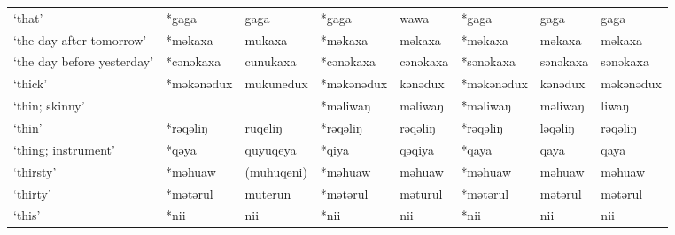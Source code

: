 \begin{landscape}
\begin{longtable}[c]{@{}p{3cm}<{\raggedright}p{2.75cm}<{\raggedright}p{2.75cm}<{\raggedright}p{2.75cm}<{\raggedright}p{2.75cm}<{\raggedright}p{2.75cm}<{\raggedright}p{2.75cm}<{\raggedright}p{2.75cm}<{\raggedright}@{}}
`that'                                               & *gaga        & gaga                          & *gaga          & wawa                       & *gaga            & gaga                     & gaga                              \\
`the day after tomorrow'                             & *məkaxa      & mukaxa                        & *məkaxa        & məkaxa                     & *məkaxa          & məkaxa                   & məkaxa                            \\
`the day before yesterday'                           & *cənəkaxa    & cunukaxa                      & *cənəkaxa      & cənəkaxa                   & *sənəkaxa        & sənəkaxa                 & sənəkaxa                          \\
`thick'                                              & *məkənədux   & mukunedux                     & *məkənədux     & kənədux                    & *məkənədux       & kənədux                  & məkənədux                         \\
`thin; skinny'                                       &              &                               & *məliwaŋ       & məliwaŋ                    & *məliwaŋ         & məliwaŋ                  & liwaŋ                             \\
`thin'                                               & *rəqəliŋ     & ruqeliŋ                       & *rəqəliŋ       & rəqəliŋ                    & *rəqəliŋ         & ləqəliŋ                  & rəqəliŋ                           \\
`thing; instrument'                                  & *qəya        & quyuqeya                      & *qiya          & qəqiya                     & *qaya            & qaya                     & qaya                              \\
`thirsty'                                            & *məhuaw      & (muhuqeni)                    & *məhuaw        & məhuaw                     & *məhuaw          & məhuaw                   & məhuaw                            \\
`thirty'                                             & *mətərul     & muterun                       & *mətərul       & məturul                    & *mətərul         & mətərul                  & mətərul                           \\
`this'                                               & *nii         & nii                           & *nii           & nii                        & *nii             & nii                      & nii                               \\

\end{longtable}
\end{landscape}
